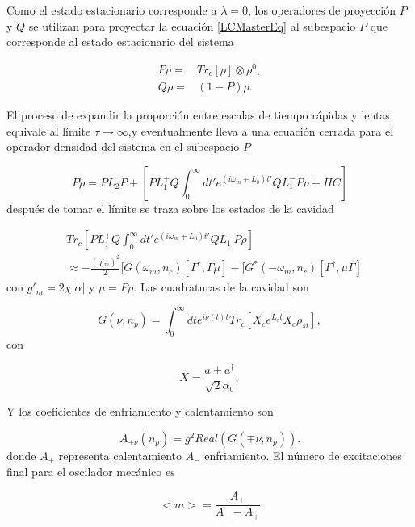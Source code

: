 \documentclass[10pt,a4paper]{report}
\begin{document}
Como el estado estacionario corresponde a $\lambda = 0$\cite{EnglertDB}, los operadores de proyección $P$ y $Q$ se utilizan para proyectar la ecuación \eqref{LCMasterEq} al subespacio $P$ que corresponde al estado estacionario del sistema


\begin{align}
P\rho=&Tr_c[\rho]\otimes \rho^{0}, \\
Q\rho=&(1-P)\rho.
\end{align}

El proceso de expandir la proporción entre escalas de tiempo rápidas y lentas equivale al límite $\tau \rightarrow \infty$,y eventualmente lleva a una ecuación  cerrada para el operador densidad del sistema en el subespacio $P$


\begin{equation}
P\dot{\rho} = PL_2P + [PL^+_1Q \int_0^\infty dt' e^{(i\omega_m +L_0)t'}QL_1^- P\rho + HC]
\end{equation} después de tomar el límite se traza sobre los estados de la cavidad

\begin{align}
&Tr_c[PL^+_1Q \int_0^\infty dt' e^{(i\omega_m +L_0)t'}QL_1^- P\rho] \\
&\approx -\frac{(g'_m)^2}{2}[G(\omega_m,n_c)[\Gamma^\dagger,\Gamma\mu]-[G^*(-\omega_m,n_c)[\Gamma^\dagger,\mu\Gamma] \nonumber
\end{align} con $g'_m = 2\chi|\alpha|$ y $\mu = P\rho$. Las cuadraturas de la cavidad son

\begin{equation} \label{CavityQuadrature}
G(\nu,n_p) = \int_0^\infty dt e^{i\nu(t) t}Tr_c[X_c e^{L_c t} X_c \rho_{st}],
\end{equation} con 


\begin{equation}
X = \frac{a + a^\dagger}{\sqrt{2}\alpha_0},
\end{equation}

Y los coeficientes de enfriamiento y calentamiento son


\begin{equation}
A_{\pm \nu}(n_p) = g^2Real(G(\mp \nu,n_p)).
\end{equation} donde $A_+$ representa calentamiento $A_-$ enfriamiento. El número de excitaciones final para el oscilador mecánico es

\begin{equation}
<m> = \frac{A_+}{A_- - A_+}
\end{equation}
\end{document}
